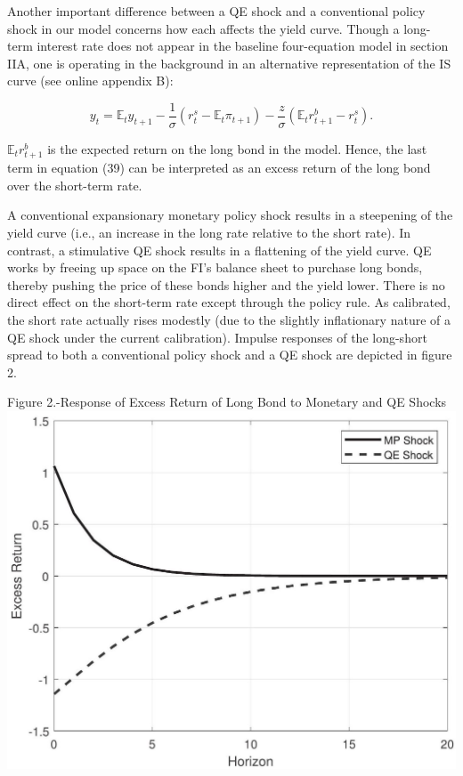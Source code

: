 \documentclass[10pt]{article}
\begin{document}
Another important difference between a QE shock and a conventional policy shock in our model concerns how each affects the yield curve. Though a long-term interest rate does not appear in the baseline four-equation model in section IIA, one is operating in the background in an alternative representation of the IS curve (see online appendix B):

\begin{equation*}
y_{t}=\mathbb{E}_{t} y_{t+1}-\frac{1}{\sigma}\left(r_{t}^{s}-\mathbb{E}_{t} \pi_{t+1}\right)-\frac{z}{\sigma}\left(\mathbb{E}_{t} r_{t+1}^{b}-r_{t}^{s}\right) . \tag{39}
\end{equation*}

$\mathbb{E}_{t} r_{t+1}^{b}$ is the expected return on the long bond in the model. Hence, the last term in equation (39) can be interpreted as an excess return of the long bond over the short-term rate.

A conventional expansionary monetary policy shock results in a steepening of the yield curve (i.e., an increase in the long rate relative to the short rate). In contrast, a stimulative QE shock results in a flattening of the yield curve. QE works by freeing up space on the FI's balance sheet to purchase long bonds, thereby pushing the price of these bonds higher and the yield lower. There is no direct effect on the short-term rate except through the policy rule. As calibrated, the short rate actually rises modestly (due to the slightly inflationary nature of a QE shock under the current calibration). Impulse responses of the long-short spread to both a conventional policy shock and a QE shock are depicted in figure 2.

Figure 2.-Response of Excess Return of Long Bond to Monetary and QE Shocks\\
\includegraphics[max width=\textwidth, center]{2024_12_20_098a9c078f922ab7e4b1g-09}
\end{document}
